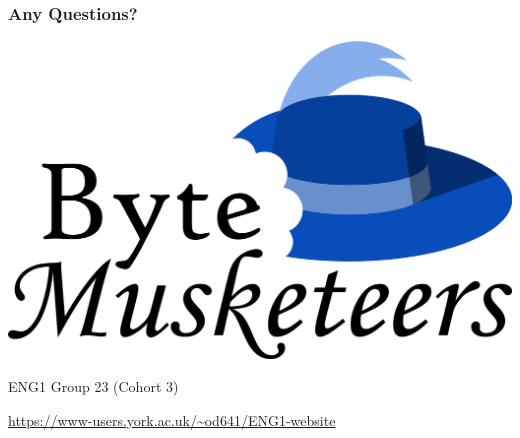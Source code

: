 \documentclass{beamer}
\numberwithin{figure}{section}
\newcommand\shortauthor{ENG1 Group 23 (Cohort 3)}
\newcommand\userurl[1]{\begingroup\color{blue}\url{#1}\endgroup}
\begin{document}
\begin{frame}
    \frametitle{Any Questions?}

    \begin{center}
        \includegraphics[width=.5\textwidth]{logo}
        \vfill
        \parbox{\textwidth}{%
            \centering\addtolength\parskip{1ex}%
            \shortauthor\par%
            \userurl{https://www-users.york.ac.uk/~od641/ENG1-website}%
        }
    \end{center}
\end{frame}
\end{document}
